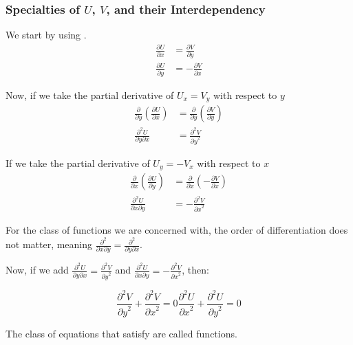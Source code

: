 \subsubsection{Specialties of $U$, $V$, and their Interdependency}\label{subsubsec:Special_U_V_Interdependency}
We start by using .
\begin{align*}
  \frac{\partial U}{\partial x} &= \frac{\partial V}{\partial y} \\
  \frac{\partial U}{\partial y} &= -\frac{\partial V}{\partial x}
\end{align*}

Now, if we take the partial derivative of $U_{x} = V_{y}$ with respect to $y$
\begin{align*}
  \frac{\partial}{\partial y} \left( \frac{\partial U}{\partial x} \right) &= \frac{\partial}{\partial y} \left( \frac{\partial V}{\partial y} \right) \\
  \frac{\partial^{2} U}{\partial y \partial x} &= \frac{\partial^{2} V}{{\partial y}^{2}}
\end{align*}

If we take the partial derivative of $U_{y} = -V_{x}$ with respect to $x$
\begin{align*}
  \frac{\partial}{\partial x} \left( \frac{\partial U}{\partial y} \right) &= \frac{\partial}{\partial x} \left( -\frac{\partial V}{\partial x} \right) \\
  \frac{\partial^{2} U}{\partial x \partial y} &= -\frac{\partial^{2} V}{{\partial x}^{2}}
\end{align*}

For the class of functions we are concerned with, the order of differentiation does not matter, meaning $\frac{\partial^{2}}{\partial x \partial y} = \frac{\partial^{2}}{\partial y \partial x}$.

Now, if we add $\frac{\partial^{2} U}{\partial y \partial x} = \frac{\partial^{2} V}{{\partial y}^{2}}$ and $\frac{\partial^{2} U}{\partial x \partial y} = -\frac{\partial^{2} V}{{\partial x}^{2}}$, then:

\begin{subequations}\label{eq:U_V_Harmonic_Relation}
  \begin{equation}\label{subeq:U_V_Harmonic_Relation-V}
    \frac{\partial^{2} V}{{\partial y}^{2}} + \frac{\partial^{2} V}{{\partial x}^{2}} = 0
  \end{equation}
  \begin{equation}\label{subeq:U_V_Harmonic_Relation-U}
    \frac{\partial^{2} U}{{\partial x}^{2}} + \frac{\partial^{2} U}{{\partial y}^{2}} = 0
  \end{equation}
\end{subequations}

The class of equations that satisfy  are called  functions.

